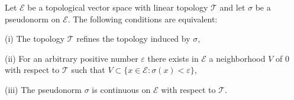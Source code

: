 Let $\mathcal{E}$ be a topological vector space with linear topology $\mathcal{T}$ and let $\sigma$ be a pseudonorm on $\mathcal{E}$. The following conditions are equivalent:

(i) The topology $\mathcal{T}$ refines the topology induced by $\sigma$,

(ii) For an arbitrary positive number $\varepsilon$ there exists in $\mathcal{E}$ a neighborhood $V$ of 0 with respect to $\mathcal{T}$ such that $V \subset \{x \in \mathcal{E} : \sigma(x) < \varepsilon\}$,

(iii) The pseudonorm $\sigma$ is continuous on $\mathcal{E}$ with respect to $\mathcal{T}$.
